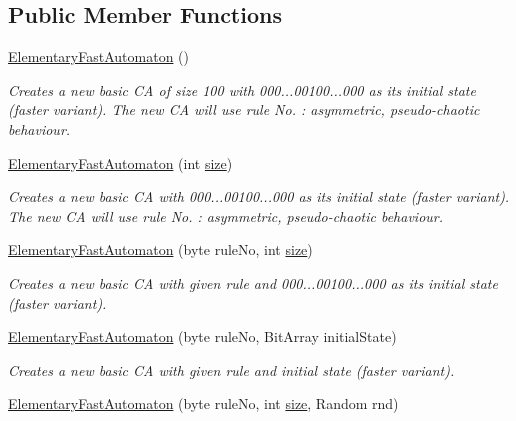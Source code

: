 \subsection*{Public Member Functions}
\begin{DoxyCompactItemize}
\item 
\hyperlink{class_cellular_1_1_elementary_fast_automaton_a523849592c63659176280e3b83c68deb}{Elementary\+Fast\+Automaton} ()
\begin{DoxyCompactList}\small\item\em Creates a new basic C\+A of size 100 with 000...00100...000 as its initial state (faster variant). The new C\+A will use rule No. \+: asymmetric, pseudo-\/chaotic behaviour. \end{DoxyCompactList}\item 
\hyperlink{class_cellular_1_1_elementary_fast_automaton_a441c7443274fb097097cd25605bcf2a4}{Elementary\+Fast\+Automaton} (int \hyperlink{class_cellular_1_1_automaton1_d_a915129ccf0f1e7092844c99ce6a28e5b}{size})
\begin{DoxyCompactList}\small\item\em Creates a new basic C\+A with 000...00100...000 as its initial state (faster variant). The new C\+A will use rule No. \+: asymmetric, pseudo-\/chaotic behaviour. \end{DoxyCompactList}\item 
\hyperlink{class_cellular_1_1_elementary_fast_automaton_ae2e62d7dd0087766f36ccd9b430ecbbe}{Elementary\+Fast\+Automaton} (byte rule\+No, int \hyperlink{class_cellular_1_1_automaton1_d_a915129ccf0f1e7092844c99ce6a28e5b}{size})
\begin{DoxyCompactList}\small\item\em Creates a new basic C\+A with given rule and 000...00100...000 as its initial state (faster variant). \end{DoxyCompactList}\item 
\hyperlink{class_cellular_1_1_elementary_fast_automaton_a2d068af48fc2d4cf58ab01893e4087d9}{Elementary\+Fast\+Automaton} (byte rule\+No, Bit\+Array initial\+State)
\begin{DoxyCompactList}\small\item\em Creates a new basic C\+A with given rule and initial state (faster variant). \end{DoxyCompactList}\item 
\hyperlink{class_cellular_1_1_elementary_fast_automaton_aa3e99cfefec68dd7764de5778397760d}{Elementary\+Fast\+Automaton} (byte rule\+No, int \hyperlink{class_cellular_1_1_automaton1_d_a915129ccf0f1e7092844c99ce6a28e5b}{size}, Random rnd)

\end{DoxyCompactItemize}

